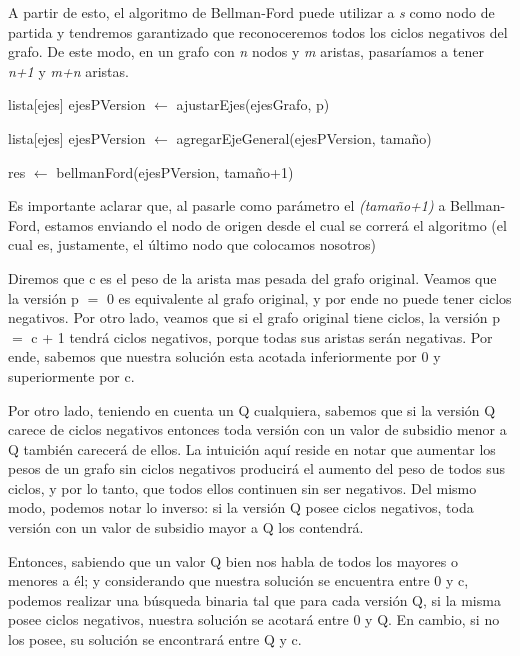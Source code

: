 A partir de esto, el algoritmo de Bellman-Ford puede utilizar a \textit{s} como nodo de partida y tendremos garantizado que reconoceremos todos los ciclos negativos del grafo. De este modo, en un grafo con \textit{n} nodos y \textit{m} aristas, pasaríamos a tener \textit{n+1} y \textit{m+n} aristas.

\begin{algorithm}[H]
	\NoCaptionOfAlgo
	\caption{}
	
	lista[ejes] ejesPVersion $\leftarrow$ ajustarEjes(ejesGrafo, p)
	
	lista[ejes] ejesPVersion $\leftarrow$ agregarEjeGeneral(ejesPVersion, tamaño)

	res $\leftarrow$ bellmanFord(ejesPVersion, tamaño+1)
\end{algorithm}

Es importante aclarar que, al pasarle como parámetro el \textit{(tamaño+1)} a Bellman-Ford, estamos enviando el nodo de origen desde el cual se correrá el algoritmo (el cual es, justamente, el último nodo que colocamos nosotros)

Diremos que c es el peso de la arista mas pesada del grafo original. Veamos que la versión p $=$ 0 es equivalente al grafo original, y por ende no puede tener ciclos negativos. Por otro lado, veamos que si el grafo original tiene ciclos, la versión p $=$ c + 1 tendrá ciclos negativos, porque todas sus aristas serán negativas. Por ende, sabemos que nuestra solución esta acotada inferiormente por 0 y superiormente por c.

Por otro lado, teniendo en cuenta un Q cualquiera, sabemos que si la versión Q carece de ciclos negativos entonces toda versión con un valor de subsidio menor a Q también carecerá de ellos. La intuición aquí reside en notar que aumentar los pesos de un grafo sin ciclos negativos producirá el aumento del peso de todos sus ciclos, y por lo tanto, que todos ellos continuen sin ser negativos. Del mismo modo, podemos notar lo inverso: si la versión Q posee ciclos negativos, toda versión con un valor de subsidio mayor a Q los contendrá.

Entonces, sabiendo que un valor Q bien nos habla de todos los mayores o menores a él; y considerando que nuestra solución se encuentra entre 0 y c, podemos realizar una búsqueda binaria tal que para cada versión Q, si la misma posee ciclos negativos, nuestra solución se acotará entre 0 y Q. En cambio, si no los posee, su solución se encontrará entre Q y c.

